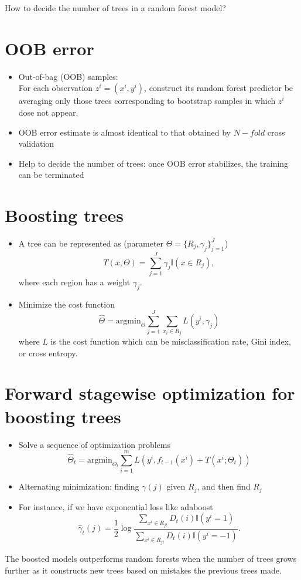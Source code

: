 \documentclass[twoside,12pt]{article}
\begin{document}
How to decide the number of trees in a random forest model? 
\section{OOB error}
\begin{itemize}
\item Out-of-bag (OOB) samples:\\
For each observation $z^i = (x^i, y^i)$, construct its random forest predictor be averaging only those trees corresponding to bootstrap samples in which $z^i$ dose not appear.

\item OOB error estimate is almost identical to that obtained by $N-fold$ cross validation
\item Help to decide the number of trees: once OOB error stabilizes, the training can be terminated
\end{itemize}

\section{Boosting trees}
\begin{itemize}
\item A tree can be represented as (parameter $\Theta = \{R_j, \gamma_j\}_{j=1}^J$)
$$T(x, \Theta) = \sum_{j=1}^J \gamma_j \mathbb{I}( x\in R_j),$$
where each region has a weight $\gamma_j$. 
\item Minimize the cost function $$\hat{\Theta} = \text{argmin}_{\Theta} \sum_{j=1}^J \sum_{x_i \in R_j} L(y^i, \gamma_j)$$
where $L$ is the cost function which can be misclassification rate, Gini index, or cross entropy. 

\end{itemize}

\section{Forward stagewise optimization for boosting trees}
\begin{itemize}
\item Solve a sequence of optimization problems
$$\hat{\Theta}_t = \text{argmin}_{\Theta_t} \sum_{i=1}^m L(y^i, f_{t-1}(x^i) + T(x^i; \Theta_t))$$
\item Alternating minimization: finding $\gamma(j)$ given $R_j$, and then find $R_j$
\item For instance, if we have exponential loss like adaboost
$$\hat{\gamma}_t(j) = \frac 1 2 \log \frac{\sum_{x^i \in R_{jt} }D_t(i) \mathbb{I}(y^i = 1)}{\sum_{x^i \in R_{jt} }D_t(i) \mathbb{I}(y^i = -1)}.$$
\end{itemize}
The boosted models outperforms random forests when the number of trees grows further as it constructs new trees based on mistakes the previous trees made. 
\end{document}
